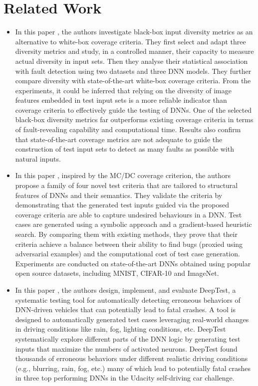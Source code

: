 \documentclass[rnd]{mas_proposal}
\begin{document}
\section{Related Work}
\begin{itemize}
    \item In this paper \cite{DBLP:journals/corr/abs-2112-12591}, the authors investigate black-box input diversity metrics as an alternative to white-box coverage criteria. They first select and adapt three diversity metrics and study, in a controlled manner, their capacity to measure actual diversity in input sets. Then they analyse their statistical association with fault detection using two datasets and three DNN models. They further compare diversity with state-of-the-art white-box coverage criteria. From the experiments, it could be inferred that relying on the diversity of image features embedded in test input sets is a more reliable indicator than coverage criteria to effectively guide the testing of DNNs. One of the selected black-box diversity metrics far outperforms existing coverage criteria in terms of fault-revealing capability and computational time. Results also confirm that state-of-the-art coverage metrics are not adequate to guide the construction of test input sets to detect as many faults as possible with natural inputs.
    
    \item In this paper \cite{DBLP:journals/corr/abs-1803-04792} , inspired by the MC/DC coverage criterion, the authors propose a family of four novel test criteria that are tailored to structural features of DNNs and their semantics. They validate the criteria by demonstrating that the generated test inputs guided via the proposed coverage criteria are able to capture undesired behaviours in a DNN. Test cases are generated using a symbolic approach and a gradient-based heuristic search. By comparing them with existing methods, they prove that their criteria achieve a balance between their ability to find bugs (proxied using adversarial examples) and the computational cost of test case generation. Experiments are conducted on state-of-the-art DNNs obtained using popular open source datasets, including MNIST, CIFAR-10 and ImageNet.
    
    \item In this paper \cite{10.1145/3180155.3180220}, the authors design, implement, and evaluate DeepTest, a systematic testing tool for automatically detecting erroneous behaviors of DNN-driven vehicles that can potentially lead to fatal crashes. A tool is designed to automatically generated test cases leveraging real-world changes in driving conditions like rain, fog, lighting conditions, etc. DeepTest systematically explore different parts of the DNN logic by generating test inputs that maximize the numbers of activated neurons. DeepTest found thousands of erroneous behaviors under different realistic driving conditions (e.g., blurring, rain, fog, etc.) many of which lead to potentially fatal crashes in three top performing DNNs in the Udacity self-driving car challenge.
    

\end{itemize}
\end{document}
